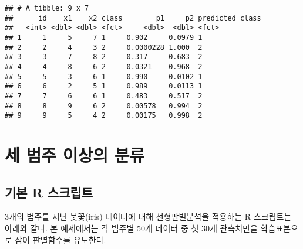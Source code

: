 \documentclass[]{book}
\newenvironment{Shaded}{\begin{snugshade}}{\end{snugshade}}
\newcommand{\DataTypeTok}[1]{\textcolor[rgb]{0.13,0.29,0.53}{#1}}
\newcommand{\KeywordTok}[1]{\textcolor[rgb]{0.13,0.29,0.53}{\textbf{#1}}}
\newcommand{\NormalTok}[1]{#1}
\newcommand{\OperatorTok}[1]{\textcolor[rgb]{0.81,0.36,0.00}{\textbf{#1}}}
\newcommand{\StringTok}[1]{\textcolor[rgb]{0.31,0.60,0.02}{#1}}
\begin{document}
\begin{Shaded}
\end{Shaded}

\begin{verbatim}
## # A tibble: 9 x 7
##      id    x1    x2 class        p1     p2 predicted_class
##   <int> <dbl> <dbl> <fct>     <dbl>  <dbl> <fct>          
## 1     1     5     7 1     0.902     0.0979 1              
## 2     2     4     3 2     0.0000228 1.000  2              
## 3     3     7     8 2     0.317     0.683  2              
## 4     4     8     6 2     0.0321    0.968  2              
## 5     5     3     6 1     0.990     0.0102 1              
## 6     6     2     5 1     0.989     0.0113 1              
## 7     7     6     6 1     0.483     0.517  2              
## 8     8     9     6 2     0.00578   0.994  2              
## 9     9     5     4 2     0.00175   0.998  2
\end{verbatim}

\hypertarget{da-multiclass}{%
\section{세 범주 이상의 분류}\label{da-multiclass}}

\hypertarget{mutliclass-da-basic-script}{%
\subsection{기본 R 스크립트}\label{mutliclass-da-basic-script}}

3개의 범주를 지닌 붓꽃(iris) 데이터에 대해 선형판별분석을 적용하는 R 스크립트는 아래와 같다. 본 예제에서는 각 범주별 50개 데이터 중 첫 30개 관측치만을 학습표본으로 삼아 판별함수를 유도한다.
\end{document}
